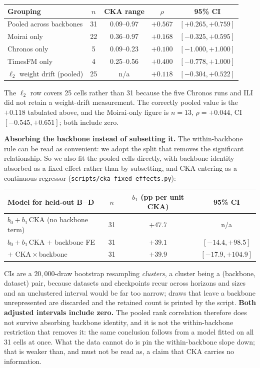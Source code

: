 \documentclass{article}
\begin{document}
\begin{center}
\small
\begin{tabular}{@{}lcccc@{}}
\toprule
Grouping & $n$ & CKA range & $\rho$ & 95\% CI \\
\midrule
Pooled across backbones & 31 & 0.09--0.97 & $+0.567$ & $[+0.265, +0.759]$ \\
\midrule
Moirai only  & 22 & 0.36--0.97 & $+0.168$ & $[-0.325, +0.595]$ \\
Chronos only & 5  & 0.09--0.23 & $+0.100$ & $[-1.000, +1.000]$ \\
TimesFM only & 4  & 0.25--0.56 & $+0.400$ & $[-0.778, +1.000]$ \\
\midrule
$\ell_2$ weight drift (pooled) & 25 & n/a & $+0.118$ & $[-0.304, +0.522]$ \\
\bottomrule
\end{tabular}
\end{center}

\noindent The $\ell_2$ row covers 25 cells rather than 31 because the five Chronos runs and ILI did not
retain a weight-drift measurement. The correctly pooled value is the $+0.118$ tabulated above,
and the Moirai-only figure is $n{=}13$, $\rho{=}+0.044$, CI $[-0.545, +0.651]$; both include zero.

\textbf{Absorbing the backbone instead of subsetting it.} The within-backbone rule can be read as
convenient: we adopt the split that removes the significant relationship. So we also fit the
pooled cells directly, with backbone identity absorbed as a fixed effect rather than by
subsetting, and CKA entering as a continuous regressor
(\texttt{scripts/cka\_fixed\_effects.py}):

\begin{center}
\small
\begin{tabular}{@{}lccc@{}}
\toprule
Model for held-out B$-$D & $n$ & $b_1$ (pp per unit CKA) & 95\% CI \\
\midrule
$b_0 + b_1\,$CKA \quad (no backbone term) & 31 & $+47.7$ & n/a \\
$b_0 + b_1\,$CKA $+$ backbone FE & 31 & $+39.1$ & $[-14.4, +98.5]$ \\
\quad $+$ CKA\,$\times$\,backbone & 31 & $+39.9$ & $[-17.9, +104.9]$ \\
\bottomrule
\end{tabular}
\end{center}

\noindent CIs are a $20{,}000$-draw bootstrap resampling \emph{clusters}, a cluster being a
(backbone, dataset) pair, because datasets and checkpoints recur across horizons and sizes and an
unclustered interval would be far too narrow; draws that leave a backbone unrepresented are
discarded and the retained count is printed by the script. \textbf{Both adjusted intervals include
zero.} The pooled rank correlation therefore does not survive absorbing backbone identity, and it
is not the within-backbone restriction that removes it: the same conclusion follows from a model
fitted on all 31 cells at once. What the data cannot do is pin the within-backbone slope down; that
is weaker than, and must not be read as, a claim that CKA carries no information.
\end{document}
